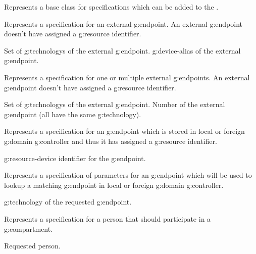 \begin{Api}
Represents a base class for specifications which can be added to the .

Represents a specification for an external \gls{g:endpoint}. An external \gls{g:endpoint} doesn't have assigned a \gls{g:resource} identifier.
\begin{ApiClassAttributes}
 Set of \glspl{g:technology} of the external \gls{g:endpoint}.
 \Gls{g:device-alias} of the external \gls{g:endpoint}.
\end{ApiClassAttributes}

Represents a specification for one or multiple external \glspl{g:endpoint}. An external \gls{g:endpoint} doesn't have assigned a \gls{g:resource} identifier.
\begin{ApiClassAttributes}
 Set of \glspl{g:technology} of the external \gls{g:endpoint}.
 Number of the external \gls{g:endpoint} (all have the same \gls{g:technology}).
\end{ApiClassAttributes}

Represents a specification for an \gls{g:endpoint} which is stored in local or foreign \gls{g:domain} \gls{g:controller} and thus it has assigned a \gls{g:resource} identifier.
\begin{ApiClassAttributes}
 \Gls{g:resource-device} identifier for the \gls{g:endpoint}.
\end{ApiClassAttributes}

Represents a specification of parameters for an \gls{g:endpoint} which will be used to lookup a matching \gls{g:endpoint} in local or foreign \gls{g:domain} \gls{g:controller}.
\begin{ApiClassAttributes}
 \Gls{g:technology} of the requested \gls{g:endpoint}.
\end{ApiClassAttributes}

Represents a specification for a person that should participate in a \gls{g:compartment}.
\begin{ApiClassAttributes}
 Requested person.
\end{ApiClassAttributes}


\end{Api}

